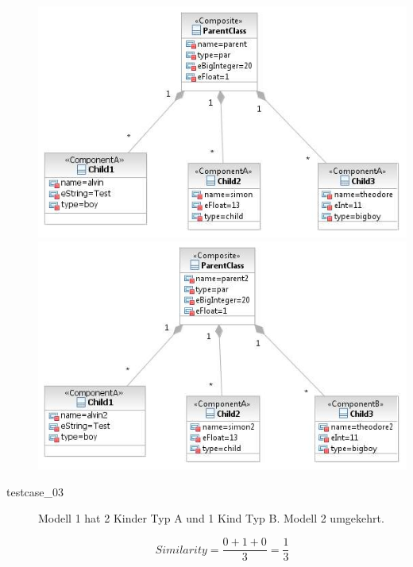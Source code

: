 \documentclass[a4paper]{article}
\begin{document}
\begin{description}
	\includegraphics[scale=0.5]{CompareChildrenEqualTypeTestScreens/Testcase02model1.jpeg}
	\includegraphics[scale=0.5]{CompareChildrenEqualTypeTestScreens/Testcase02model2.jpeg}

  \item[testcase\_03] Modell 1 hat 2 Kinder Typ A und 1 Kind Typ B. Modell 2 umgekehrt.
  
   \begin{equation*}
   Similarity = \frac{0+1+0}{3}=\frac{1}{3}
   \end{equation*}
    

\end{description}
\end{document}
